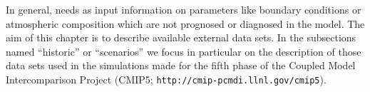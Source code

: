 In general, \echam{} needs as input information on  
parameters like boundary conditions or atmospheric composition which are not prognosed or diagnosed in the model.
The aim of this chapter is to describe available external data sets. In the subsections named ``historic'' or
``scenarios'' we focus in particular on the description of those data sets used in the \echam{} simulations made for the fifth 
phase of the Coupled Model Intercomparison Project (CMIP5; {\tt http://cmip-pcmdi.llnl.gov/cmip5}).
